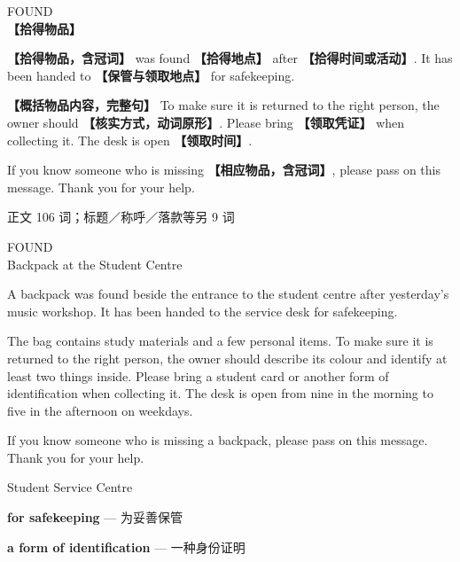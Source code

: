 \documentclass[11pt,a4paper,fontset=macnew]{ctexart}
\newenvironment{writing}{\begingroup\fontsize{10.5}{13.5}\selectfont\setlength{\parskip}{3pt}}{\par\endgroup}
\newenvironment{example}{\begingroup\fontsize{11}{14.3}\selectfont\setlength{\parskip}{4pt}}{\par\endgroup}
\begin{document}
\begin{writing}
{\centering FOUND\\{\bfseries 【拾得物品】}\par}
{\bfseries 【拾得物品，含冠词】} was found {\bfseries 【拾得地点】} after {\bfseries 【拾得时间或活动】}. It has been handed to {\bfseries 【保管与领取地点】} for safekeeping.

{\bfseries 【概括物品内容，完整句】} To make sure it is returned to the right person, the owner should {\bfseries 【核实方式，动词原形】}. Please bring {\bfseries 【领取凭证】} when collecting it. The desk is open {\bfseries 【领取时间】}.

If you know someone who is missing {\bfseries 【相应物品，含冠词】}, please pass on this message. Thank you for your help.

\par
\end{writing}
\par\vspace{4pt}{\bfseries 完整套用示例}\par\nopagebreak
{\small 正文 106 词；标题／称呼／落款等另 9 词}\par
\begin{example}
{\centering FOUND\\Backpack at the Student Centre\par}
A backpack was found beside the entrance to the student centre after yesterday's music workshop. It has been handed to the service desk for safekeeping.

The bag contains study materials and a few personal items. To make sure it is returned to the right person, the owner should describe its colour and identify at least two things inside. Please bring a student card or another form of identification when collecting it. The desk is open from nine in the morning to five in the afternoon on weekdays.

If you know someone who is missing a backpack, please pass on this message. Thank you for your help.

\noindent Student Service Centre\par
\end{example}
\par\vspace{4pt}{\bfseries 好词好句：优先记这三处}\par\nopagebreak
{\small\textbf{for safekeeping} — 为妥善保管}\par
{\small\textbf{a form of identification} — 一种身份证明}\par
\end{document}
